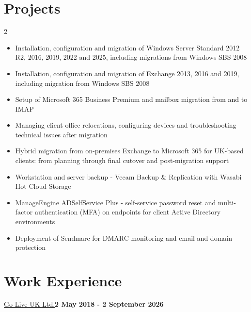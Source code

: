 \documentclass[a4paper, 10pt]{article}
\begin{document}
		\section*{Projects}
		\begin{multicols}{2}
		\raggedright
		\begin{itemize}
			\item Installation, configuration and migration of Windows Server Standard 2012 R2, 2016, 2019, 2022 and 2025, including migrations from Windows SBS 2008
			
			\item Installation, configuration and migration of Exchange 2013, 2016 and 2019, including migration from Windows SBS 2008
			
			\item Setup of Microsoft 365 Business Premium and mailbox migration from and to IMAP
			
			\item Managing client office relocations, configuring devices and troubleshooting technical issues after migration
			
			\item Hybrid migration from on-premises Exchange to Microsoft 365 for UK-based clients: from planning through final cutover and post-migration support
			
			\item Workstation and server backup - Veeam Backup \& Replication with Wasabi Hot Cloud Storage
			
			\item ManageEngine ADSelfService Plus - self-service password reset and multi-factor authentication (MFA) on endpoints for client Active Directory environments
			
			\item Deployment of Sendmarc for DMARC monitoring and email and domain protection
				
		\end{itemize}
		\end{multicols}
	
	\newpage
	\section*{Work Experience}
	\href{https://www.goliveuk.com/}{Go Live UK Ltd.}\hfill \textbf{2 May 2018 - 2 September 2026}
	
\end{document}
